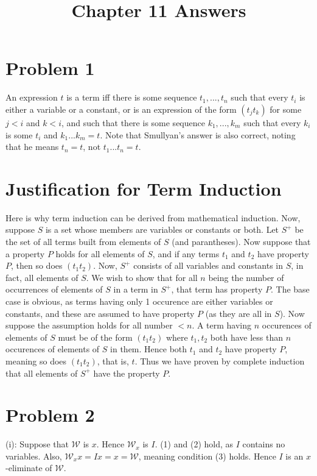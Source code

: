\documentclass{article}
\title{Chapter 11 Answers}
\theoremstyle{definition}
\begin{document}
\date{}
\maketitle

\section*{Problem 1}
An expression $t$ is a term iff there is some sequence $t_1,...,t_n$ such that every $t_i$ is either a variable or a constant, or is an expression of the form 
$(t_jt_k)$ for some $j<i$ and $k<i$, and such that there is some sequence $k_1,...,k_m$ such that every $k_i$ is some $t_i$ and 
$k_1...k_m=t$.
Note that Smullyan's answer is also correct, noting that he means $t_n=t$, not $t_1...t_n=t$.

\section*{Justification for Term Induction}
Here is why term induction can be derived from mathematical induction. Now, suppose $S$ is a set whose members are variables or constants or both. 
Let $S^+$ be the set of all terms built from elements of $S$ (and parantheses). Now suppose that a property $P$ holds for all elements of $S$, and if any terms 
$t_1$ and $t_2$ have property $P$, then so does $(t_1t_2)$. Now, $S^+$ consists of all variables and constants in $S$, in fact, all elements of $S$. We wish to show that 
for all $n$ being the number of occurrences of elements of $S$ in a term in $S^+$, that term has property $P$. The base case is obvious, as terms having only 1 occurence are 
either variables or constants, and these are assumed to have property $P$ (as they are all in $S$). Now suppose the assumption holds for all number $<n$. A term having 
$n$ occurences of elements of $S$ must be of the form $(t_1t_2)$ where $t_1,t_2$ both have less than $n$ occurences of elements of $S$ in them. Hence both 
$t_1$ and $t_2$ have property $P$, meaning so does $(t_1t_2)$, that is, $t$. Thus we have proven by complete induction that all elements of $S^+$ have the property $P$.

\section*{Problem 2}
(i): Suppose that $\mathcal{W}$ is $x$. Hence $\mathcal{W}_x$ is $I$. (1) and (2) hold, as $I$ contains no variables. Also, $\mathcal{W}_xx=Ix=x=\mathcal{W}$, 
meaning condition (3) holds. Hence $I$ is an $x$-eliminate of $\mathcal{W}$.
\end{document}
